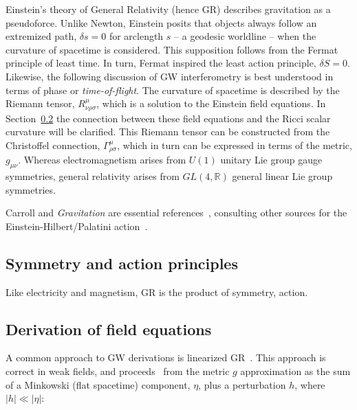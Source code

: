         Einstein's theory of General Relativity (hence GR) describes gravitation as a pseudoforce. 
Unlike Newton, Einstein posits that objects always follow an extremized path, $\delta s = 0$ for arclength $s$  -- a geodesic worldline -- when the curvature of spacetime is considered. 
This supposition follows from the Fermat principle of least time.
In turn, Fermat inspired the least action principle, $\delta S = 0$.
Likewise, the following discussion of GW interferometry is best understood in terms of phase or \textit{time-of-flight}.
The curvature of spacetime is described by the Riemann tensor, $R^\mu_{\nu\rho\sigma}$, which is a solution to the Einstein field equations. 
In Section~\ref{field_equations} the connection between these field equations and the Ricci scalar curvature will be clarified. 
This Riemann tensor can be constructed from the Christoffel connection, $\Gamma^\mu_{\rho\sigma}$, which in turn can be expressed in terms of the metric, $g_{\mu \nu}$.
Whereas electromagnetism arises from $U(1)$ unitary Lie group gauge symmetries, general relativity arises from $GL(4, \mathbb{R})$ general linear Lie group symmetries.

 Carroll and \textit{Gravitation} are essential references~\cite{Carroll1997,MisnerThorneWheeler}, consulting other sources for the Einstein-Hilbert/Palatini action~\cite{FarrThesis}.


        \subsection{Symmetry and action principles}
        \label{principles}

            Like electricity and magnetism, GR is the product of symmetry, action. 


        \subsection{Derivation of field equations}
        \label{field_equations}

            A common approach to GW derivations is linearized GR~\cite{FlanaganHughes2005}.
            This approach is correct in weak fields, and proceeds~\cite{AdhikariThesis} from the metric $g$ approximation as the sum of a Minkowski (flat spacetime) component, $\eta$, plus a perturbation $h$, where $|h| \ll |\eta|$:


